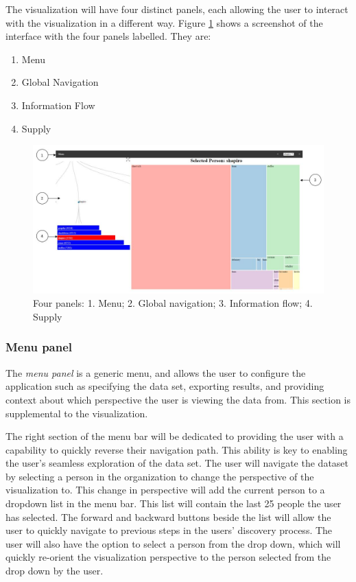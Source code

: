 \documentclass[12pt,letterpaper]{article}
\begin{document}
The visualization will have four distinct panels, each allowing the user to interact with the visualization in a different way. Figure \ref{fig:allpanels} shows a screenshot of the interface with the four panels labelled. They are:
\begin{enumerate}
\item Menu
\item Global Navigation
\item Information Flow
\item Supply
\end{enumerate}

\begin{figure}
  \centering
  \includegraphics[width=\columnwidth]{pics/whole_app_numbers.jpg}
  \caption[All panels]{Four panels: 1. Menu; 2. Global navigation; 3. Information flow; 4. Supply}
  \label{fig:allpanels}
\end{figure}

\subsubsection{Menu panel}

The \emph{menu panel} is a generic menu, and allows the user to configure the application such as specifying the data set, exporting results, and providing context about which perspective the user is viewing the data from. This section is supplemental to the visualization.  

The right section of the menu bar will be dedicated to providing the user with a capability to quickly reverse their navigation path.  This ability is key to enabling the user’s seamless exploration of the data set.  The user will navigate the dataset by selecting a person in the organization to change the perspective of the visualization to.  This change in perspective will add the current person to a dropdown list in the menu bar.  This list will contain the last 25 people the user has selected.  The forward and backward buttons beside the list will allow the user to quickly navigate to previous steps in the users’ discovery process.  The user will also have the option to select a person from the drop down, which will quickly re-orient the visualization perspective to the person selected from the drop down by the user.
\end{document}
